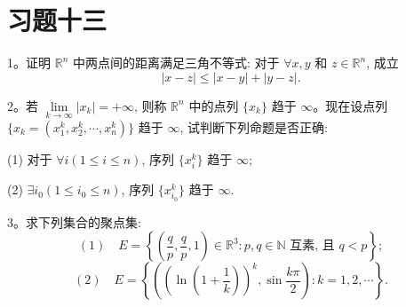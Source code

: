 \section*{习题十三}
{}
\label{exercises:ma-13}

1。证明 $\mathbb R^n$ 中两点间的距离满足三角不等式: 对于 $\forall x,y$ 和 $z\in\mathbb R^n$, 成立
\[
  |x-z|\leqslant |x-y|+|y-z|.
\]

2。若 $\lim\limits_{k\to\infty}|x_k|=+\infty$, 则称 $\mathbb R^n$ 中的点列 $\{x_k\}$ 趋于 $\infty$。现在设点列 $\{x_k=(x_1^k,x_2^k,\cdots,x_n^k)\}$ 趋于 $\infty$, 试判断下列命题是否正确:

(1) 对于 $\forall i(1\leqslant i\leqslant n)$, 序列 $\{x_i^k\}$ 趋于 $\infty$;

(2) $\exists i_0(1\leqslant i_0\leqslant n)$, 序列 $\{x_{i_0}^k\}$ 趋于 $\infty$.

3。求下列集合的聚点集:
\[
  (1)\quad E=\left\{\left(\frac qp,\frac qp,1\right)\in\mathbb R^3:p,q\in\mathbb N\text{ 互素, 且 }q<p\right\};
\]
\[
  (2)\quad E=\left\{\left(\left(\ln\left(1+\frac1k\right)\right)^k,\sin\frac{k\pi}{2}\right):k=1,2,\cdots\right\}.
\]

